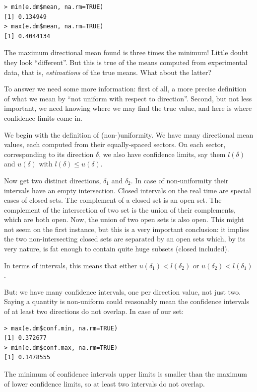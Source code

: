 \documentclass[a4paper,10pt]{book}
\begin{document}
\begin{verbatim}
> min(e.dm$mean, na.rm=TRUE)
[1] 0.134949
> max(e.dm$mean, na.rm=TRUE)
[1] 0.4044134
\end{verbatim}

The maximum directional mean found is three times the minimum! Little doubt they look ``different''. But this is true of the means computed from experimental data, that is, \emph{estimations} of the true means. What about the latter?

To answer we need some more information: first of all, a more precise definition of what we mean by ``not uniform with respect to direction''. Second, but not less important, we need knowing where we may find the true value, and here is where confidence limits come in.

We begin with the definition of (non-)uniformity. We have many directional mean values, each computed from their equally-spaced sectors. On each sector, corresponding to its direction $\delta$, we also have confidence limits, say them $l(\delta)$ and $u(\delta)$ with $l(\delta) \le u(\delta)$.

Now get two distinct directions, $\delta_{1}$ and $\delta_{2}$. In case of non-uniformity their intervals have an empty intersection. Closed intervals on the real time are special cases of closed sets. The complement of a closed set is an open set. The complement of the intersection of two set is the union of their complements, which are both open. Now, the union of two open sets is also open. This might not seem on the first instance, but this is a very important conclusion: it implies the two non-intersecting closed sets are separated by an open sets which, by its very nature, is fat enough to contain quite huge subsets (closed included).

In terms of intervals, this means that either $u(\delta_{1}) < l(\delta_{2})$ or $u(\delta_{2}) < l(\delta_{1})$.

But: we have many confidence intervals, one per direction value, not just two. Saying a quantity is non-uniform could reasonably mean the confidence intervals of at least two directions do not overlap. In case of our set:


\begin{verbatim}
> max(e.dm$conf.min, na.rm=TRUE)
[1] 0.372677
> min(e.dm$conf.max, na.rm=TRUE)
[1] 0.1478555
\end{verbatim}

The minimum of confidence intervals upper limits is smaller than the maximum of lower confidence limits, so at least two intervals do not overlap.
\end{document}
